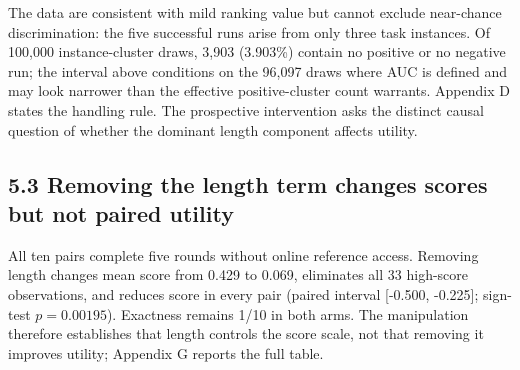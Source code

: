 \documentclass{article}
\begin{document}
\begin{center}
\end{center}

The data are consistent with mild ranking value but cannot exclude near-chance discrimination: the five successful runs arise from only three task instances. Of 100,000 instance-cluster draws, 3,903 (3.903\%) contain no positive or no negative run; the interval above conditions on the 96,097 draws where AUC is defined and may look narrower than the effective positive-cluster count warrants. Appendix D states the handling rule. The prospective intervention asks the distinct causal question of whether the dominant length component affects utility.

\subsection{5.3 Removing the length term changes scores but not paired utility}

All ten pairs complete five rounds without online reference access. Removing length changes mean score from 0.429 to 0.069, eliminates all 33 high-score observations, and reduces score in every pair (paired interval [-0.500, -0.225]; sign-test \(p=0.00195\)). Exactness remains 1/10 in both arms. The manipulation therefore establishes that length controls the score scale, not that removing it improves utility; Appendix G reports the full table.
\end{document}
